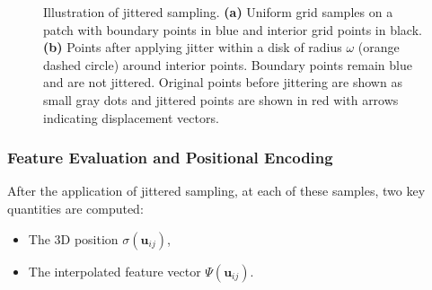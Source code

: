 \begin{figure}[h!]
\begin{adjustbox}{center}
  \end{adjustbox}
  \caption{Illustration of jittered sampling. \textbf{(a)} Uniform grid samples on a patch with boundary points in blue and interior grid points in black. \textbf{(b)} Points after applying jitter within a disk of radius \(\omega\) (orange dashed circle) around interior points. Boundary points remain blue and are not jittered. Original points before jittering are shown as small gray dots and jittered points are shown in red with arrows indicating displacement vectors.}
  \label{fig:jittered-sampling}
\end{figure}

\subsubsection{Feature Evaluation and Positional Encoding}

After the application of jittered sampling, at each of these samples, two key quantities are computed:  
\begin{itemize}
  \item The 3D position $\sigma(\mathbf{u}_{ij})$,  
  \item The interpolated feature vector $\Psi(\mathbf{u}_{ij})$.  
\end{itemize}

